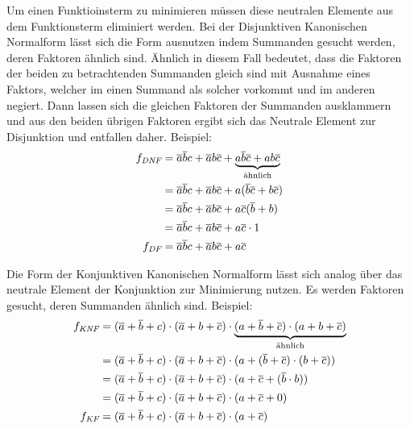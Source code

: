 Um einen Funktioinsterm zu minimieren müssen diese neutralen Elemente aus dem Funktionsterm eliminiert werden. Bei der Disjunktiven Kanonischen Normalform lässt sich die Form ausnutzen indem Summanden gesucht werden, deren Faktoren ähnlich sind. Ähnlich in diesem Fall bedeutet, dass die Faktoren der beiden zu betrachtenden Summanden gleich sind mit Ausnahme eines Faktors, welcher im einen Summand als solcher vorkommt und im anderen negiert. Dann lassen sich die gleichen Faktoren der Summanden ausklammern und aus den beiden übrigen Faktoren ergibt sich das Neutrale Element zur Disjunktion und entfallen daher. Beispiel:
\begin{align*}
	f_{\textit{DNF}} &= \overline{a}\overline{b}c + \overline{a}b\overline{c} 
		+ \underbrace{a\overline{b}\overline{c} + ab\overline{c}}_{\textnormal{ähnlich}} \\
	&= \overline{a}\overline{b}c + \overline{a}b\overline{c} 
		+ a(\overline{b}\overline{c} + b\overline{c}) \\
	&= \overline{a}\overline{b}c + \overline{a}b\overline{c} 
		+ a\overline{c}(\overline{b} + b) \\
	&= \overline{a}\overline{b}c + \overline{a}b\overline{c} 
		+ a\overline{c} \cdot 1 \\
	f_{\textit{DF}} &= \overline{a}\overline{b}c + \overline{a}b\overline{c}
		+ a\overline{c} \\
\end{align*}

Die Form der Konjunktiven Kanonischen Normalform lässt sich analog über das neutrale Element der Konjunktion zur Minimierung nutzen. Es werden Faktoren gesucht, deren Summanden ähnlich sind. Beispiel:
\begin{align*}
	f_{\textit{KNF}} &= (\overline{a} + \overline{b} + c) \cdot (\overline{a} + b + \overline{c}) 
		\cdot \underbrace{(a + \overline{b} + \overline{c}) \cdot (a + b + \overline{c})}_{\textnormal{ähnlich}} \\
	&= (\overline{a} + \overline{b} + c) \cdot (\overline{a} + b + \overline{c}) 
		\cdot (a + (\overline{b} + \overline{c}) \cdot (b + \overline{c})) \\
	&= (\overline{a} + \overline{b} + c) \cdot (\overline{a} + b + \overline{c}) 
		\cdot (a + \overline{c} + (\overline{b} \cdot b)) \\
	&= (\overline{a} + \overline{b} + c) \cdot (\overline{a} + b + \overline{c}) 
		\cdot (a + \overline{c} + 0) \\
	f_{\textit{KF}} &= (\overline{a} + \overline{b} + c) \cdot (\overline{a} + b + \overline{c}) 
		\cdot (a + \overline{c}) \\
\end{align*}

